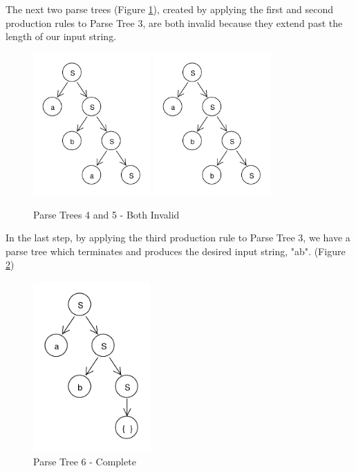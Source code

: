 \documentclass[11pt]{article}
\begin{document}
The next two parse trees (Figure \ref{fig:rdp_4_5}), created by applying the first and second production rules to
Parse Tree 3, are both invalid because they extend past the length of our input string.

\begin{figure}[h!]
    \centering
    \includegraphics[width=0.4\textwidth,natwidth=30,natheight=30]{rdp_4.pdf}
    \includegraphics[width=0.4\textwidth,natwidth=30,natheight=30]{rdp_5.pdf}
    \caption{Parse Trees 4 and 5 - Both Invalid}
    \label{fig:rdp_4_5}
\end{figure}

In the last step, by applying the third production rule to Parse Tree 3, we have a parse tree which terminates and produces the
desired input string, "ab". (Figure \ref{fig:rdp_6})

\begin{figure}[h!]
    \centering
    \includegraphics[width=0.4\textwidth,natwidth=30,natheight=30]{rdp_6.pdf}
    \caption{Parse Tree 6 - Complete}
    \label{fig:rdp_6}
\end{figure}
\end{document}
